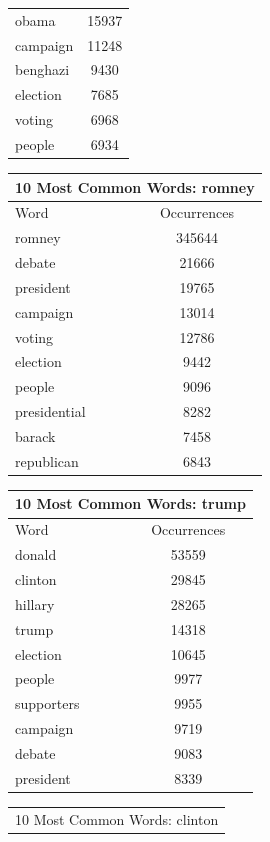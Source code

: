 \documentclass[12pt,a4paper]{report}
\begin{document}
\begin{table}[ht]
\begin{tabular}[t]{|l|c|}
      obama & 15937 \\
      campaign & 11248 \\
      benghazi & 9430 \\
      election & 7685 \\
      voting & 6968 \\
      people & 6934 \\
      \hline
    \end{tabular}\hfill%
    \begin{tabular}[t]{|l|c|}
      \hline
      \multicolumn{2}{|c|}{10 Most Common Words: romney} \\
      \hline
      Word & Occurrences \\ [0.5ex]
      \hline
      \hline
      romney & 345644 \\
      debate & 21666 \\
      president & 19765 \\
      campaign & 13014 \\
      voting & 12786 \\
      election & 9442 \\
      people & 9096 \\
      presidential & 8282 \\
      barack & 7458 \\
      republican & 6843 \\
      \hline
    \end{tabular}\hfill%
    \begin{tabular}[t]{|l|c|}
      \hline
      \multicolumn{2}{|c|}{10 Most Common Words: trump} \\
      \hline
      Word & Occurrences \\ [0.5ex]
      \hline
      \hline
      donald & 53559 \\
      clinton &  29845 \\
      hillary & 28265 \\
      trump & 14318 \\
      election & 10645 \\
      people & 9977 \\
      supporters & 9955 \\
      campaign & 9719 \\
      debate & 9083 \\
      president &  8339 \\
      \hline
    \end{tabular}\hfill%
    \begin{tabular}[t]{|l|c|}
      \hline
      \multicolumn{2}{|c|}{10 Most Common Words: clinton} \\

\end{tabular}
\end{table}
\end{document}
